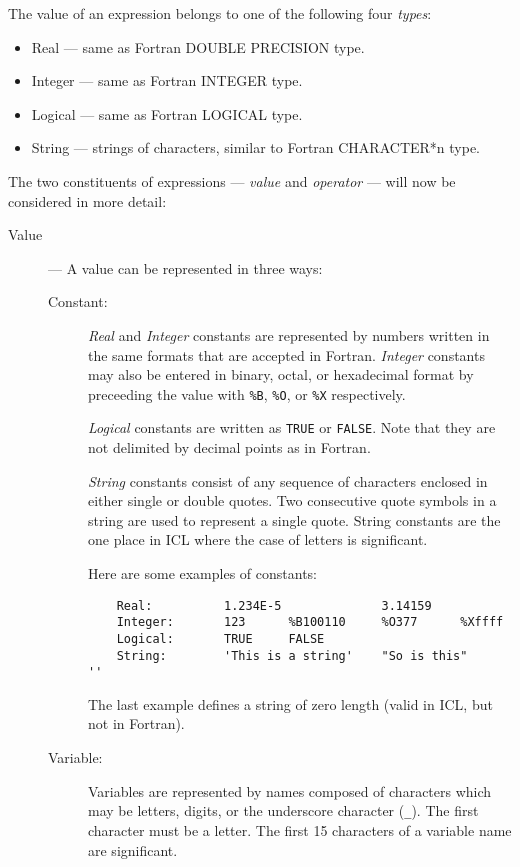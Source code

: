 The value of an expression belongs to one of the following four
{\em types}:
\begin{itemize}
\item Real --- same as Fortran DOUBLE PRECISION type.
\item Integer --- same as Fortran INTEGER type.
\item Logical --- same as Fortran LOGICAL type.
\item String --- strings of characters, similar to Fortran CHARACTER*n type.
\end{itemize}
The two constituents of expressions --- {\em value} and {\em operator} --- will
now be considered in more detail:
\begin{description}
\item [Value] ---
A value can be represented in three ways:
\begin{description}
\item[Constant:] \mbox{}

{\em Real} and {\em Integer} constants are represented by numbers written in
the same formats that are accepted in Fortran.
{\em Integer} constants may also be entered in binary, octal, or hexadecimal
format by preceeding the value with \verb+%B+, \verb+%O+, or \verb+%X+
respectively.

{\em Logical} constants are written as \verb+TRUE+ or \verb+FALSE+.
Note that they are not delimited by decimal points as in Fortran.

{\em String} constants consist of any sequence of characters enclosed in either
single or double quotes.
Two consecutive quote symbols in a string are used to represent a single quote.
String constants are the one place in ICL where the case of letters is
significant.

Here are some examples of constants:

\begin{small}
\begin{verbatim}
    Real:          1.234E-5              3.14159
    Integer:       123      %B100110     %O377      %Xffff
    Logical:       TRUE     FALSE
    String:        'This is a string'    "So is this"      ''
\end{verbatim}
\end{small}

The last example defines a string of zero length (valid in ICL, but not in
Fortran).

\item[Variable:] \mbox{}

Variables are represented by names composed of characters which may be letters,
digits, or the underscore character (\verb+_+).
The first character must be a letter.
The first 15 characters of a variable name are significant.


\end{description}
\end{description}
